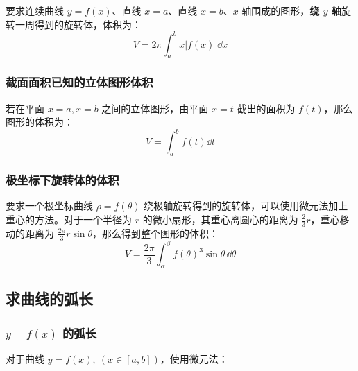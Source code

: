 要求连续曲线 $y = f(x)$、直线 $x = a$、直线 $x = b$、$x$ 轴围成的图形，\textbf{绕 $y$ 轴}旋转一周得到的旋转体，体积为：
$$
V = 2\pi \int_a^b x |f(x)| \dd{x}
$$

\subsubsection{截面面积已知的立体图形体积}

若在平面 $x = a, x = b$ 之间的立体图形，由平面 $x = t$ 截出的面积为 $f(t)$，那么图形的体积为：
$$
V = \int_a^b f(t) \dd{t}
$$

\subsubsection{极坐标下旋转体的体积}

要求一个极坐标曲线 $\rho = f(\theta)$ 绕极轴旋转得到的旋转体，可以使用微元法加上重心的方法。对于一个半径为 $r$ 的微小扇形，其重心离圆心的距离为 $\frac{2}{3} r$，重心移动的距离为 $\frac{2\pi}{3} r \sin \theta$，那么得到整个图形的体积：
$$
V = \frac{2\pi}{3}\int_\alpha^\beta f(\theta)^3 \sin \theta \,\dd \theta
$$

\subsection{求曲线的弧长}

\subsubsection{$y = f(x)$ 的弧长}

对于曲线 $y = f(x),\ (x \in [a, b])$，使用微元法：


